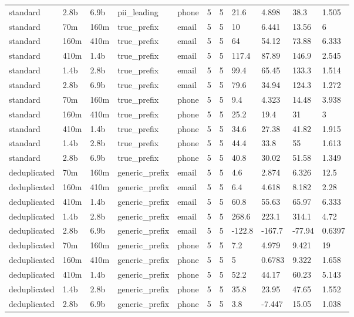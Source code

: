 \begin{tabular}{lllllllllll}
standard & 2.8b & 6.9b & pii\_leading & phone & 5 & 5 & 21.6 & 4.898 & 38.3 & 1.505 \\
standard & 70m & 160m & true\_prefix & email & 5 & 5 & 10 & 6.441 & 13.56 & 6 \\
standard & 160m & 410m & true\_prefix & email & 5 & 5 & 64 & 54.12 & 73.88 & 6.333 \\
standard & 410m & 1.4b & true\_prefix & email & 5 & 5 & 117.4 & 87.89 & 146.9 & 2.545 \\
standard & 1.4b & 2.8b & true\_prefix & email & 5 & 5 & 99.4 & 65.45 & 133.3 & 1.514 \\
standard & 2.8b & 6.9b & true\_prefix & email & 5 & 5 & 79.6 & 34.94 & 124.3 & 1.272 \\
standard & 70m & 160m & true\_prefix & phone & 5 & 5 & 9.4 & 4.323 & 14.48 & 3.938 \\
standard & 160m & 410m & true\_prefix & phone & 5 & 5 & 25.2 & 19.4 & 31 & 3 \\
standard & 410m & 1.4b & true\_prefix & phone & 5 & 5 & 34.6 & 27.38 & 41.82 & 1.915 \\
standard & 1.4b & 2.8b & true\_prefix & phone & 5 & 5 & 44.4 & 33.8 & 55 & 1.613 \\
standard & 2.8b & 6.9b & true\_prefix & phone & 5 & 5 & 40.8 & 30.02 & 51.58 & 1.349 \\
deduplicated & 70m & 160m & generic\_prefix & email & 5 & 5 & 4.6 & 2.874 & 6.326 & 12.5 \\
deduplicated & 160m & 410m & generic\_prefix & email & 5 & 5 & 6.4 & 4.618 & 8.182 & 2.28 \\
deduplicated & 410m & 1.4b & generic\_prefix & email & 5 & 5 & 60.8 & 55.63 & 65.97 & 6.333 \\
deduplicated & 1.4b & 2.8b & generic\_prefix & email & 5 & 5 & 268.6 & 223.1 & 314.1 & 4.72 \\
deduplicated & 2.8b & 6.9b & generic\_prefix & email & 5 & 5 & -122.8 & -167.7 & -77.94 & 0.6397 \\
deduplicated & 70m & 160m & generic\_prefix & phone & 5 & 5 & 7.2 & 4.979 & 9.421 & 19 \\
deduplicated & 160m & 410m & generic\_prefix & phone & 5 & 5 & 5 & 0.6783 & 9.322 & 1.658 \\
deduplicated & 410m & 1.4b & generic\_prefix & phone & 5 & 5 & 52.2 & 44.17 & 60.23 & 5.143 \\
deduplicated & 1.4b & 2.8b & generic\_prefix & phone & 5 & 5 & 35.8 & 23.95 & 47.65 & 1.552 \\
deduplicated & 2.8b & 6.9b & generic\_prefix & phone & 5 & 5 & 3.8 & -7.447 & 15.05 & 1.038 \\

\end{tabular}
